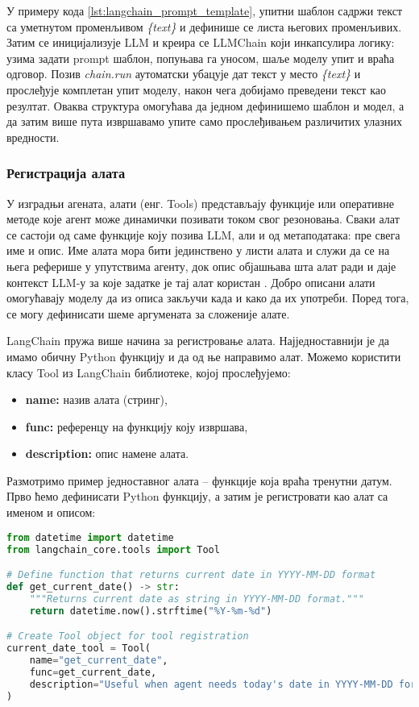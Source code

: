 У примеру кода \ref{lst:langchain_prompt_template}, упитни шаблон садржи текст са уметнутом променљивом \textit{\{text\}} и дефинише се листа његових променљивих. Затим се иницијализује LLM и креира се LLMChain који инкапсулира логику: узима задати prompt шаблон, попуњава га уносом, шаље моделу упит и враћа одговор. Позив \textit{chain.run} аутоматски убацује дат текст у место \textit{\{text\}} и прослеђује комплетан упит моделу, након чега добијамо преведени текст као резултат. Оваква структура омогућава да једном дефинишемо шаблон и модел, а да затим више пута извршавамо упите само прослеђивањем различитих улазних вредности.

\subsubsection{Регистрација алата}

У изградњи агената, алати (енг. Tools) представљају функције или оперативне методе које агент може динамички позивати током свог резоновања. Сваки алат се састоји од саме функције коју позива LLM, али и од метаподатака: пре свега име и опис. Име алата мора бити јединствено у листи алата и служи да се на њега реферише у упутствима агенту, док опис објашњава шта алат ради и даје контекст LLM-у за које задатке је тај алат користан \cite{langchain_docs_2024}. Добро описани алати омогућавају моделу да из описа закључи када и како да их употреби. Поред тога, се могу дефинисати шеме аргумената за сложеније алате.

LangChain пружа више начина за регистровање алата. Најједноставнији је да имамо обичну Python функцију и да од ње направимо алат. Можемо користити класу Tool из LangChain библиотеке, којој прослеђујемо:
\begin{itemize}
    \item \textbf{name:} назив алата (стринг),
    \item \textbf{func:} референцу на функцију коју извршава,
    \item \textbf{description:} опис намене алата.
\end{itemize}

Размотримо пример једноставног алата -- функције која враћа тренутни датум. Прво ћемо дефинисати Python функцију, а затим је регистровати као алат са именом и описом:

\begin{lstlisting}[language=Python, caption={Регистрација простог алата за тренутни датум}, label={lst:simple_tool_registration}]
from datetime import datetime
from langchain_core.tools import Tool

# Define function that returns current date in YYYY-MM-DD format
def get_current_date() -> str:
    """Returns current date as string in YYYY-MM-DD format."""
    return datetime.now().strftime("%Y-%m-%d")

# Create Tool object for tool registration
current_date_tool = Tool(
    name="get_current_date",
    func=get_current_date,
    description="Useful when agent needs today's date in YYYY-MM-DD format"
)
\end{lstlisting}

